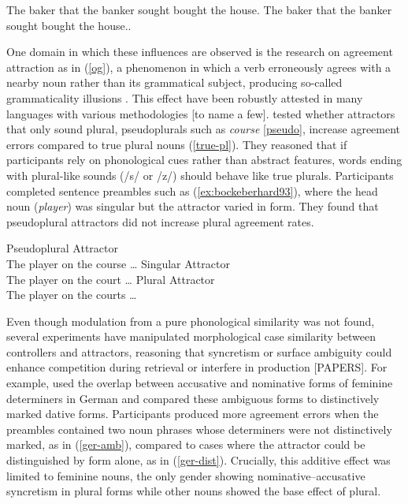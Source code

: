 \documentclass[
  authoryear,
  3p]{elsarticle}
\begin{document}
\begin{exe}
\ex \label{baker} The baker that the banker sought bought the house.
\ex \label{runner} The baker that the banker sought bought the house..
\end{exe}

One domain in which these influences are observed is the research on
agreement attraction as in (\ref{og}), a phenomenon in which a verb
erroneously agrees with a nearby noun rather than its grammatical
subject, producing so-called grammaticality illusions
\citep{BockMiller:1991, PearlmutterGarnseyBock:1999}. This effect have
been robustly attested in many languages with various methodologies
{[}to name a few{]}. \citet{BockEberhard1993} tested whether attractors
that only sound plural, pseudoplurals such as \emph{course}
\ref{pseudo}, increase agreement errors compared to true plural nouns
(\ref{true-pl}). They reasoned that if participants rely on phonological
cues rather than abstract features, words ending with plural-like sounds
(/s/ or /z/) should behave like true plurals. Participants completed
sentence preambles such as (\ref{ex:bockeberhard93}), where the head
noun (\emph{player}) was singular but the attractor varied in form. They
found that pseudoplural attractors did not increase plural agreement
rates.

\begin{exe}
\ex \label{ex:bockeberhard93}
\begin{xlist}
    \ex \label{pseudo} {Pseudoplural Attractor} \\ The {player} on the {course} \ldots{}
    \ex \label{true-sg} {Singular Attractor} \\ The {player} on the {court} \ldots{}
    \ex \label{true-pl} {Plural Attractor} \\ The {player} on the {courts} \ldots{}
\end{xlist}
\end{exe}

Even though modulation from a pure phonological similarity was not
found, several experiments have manipulated morphological case
similarity between controllers and attractors, reasoning that syncretism
or surface ambiguity could enhance competition during retrieval or
interfere in production {[}PAPERS{]}. For example,
\citet{HartsuikerEtAl2003} used the overlap between accusative and
nominative forms of feminine determiners in German and compared these
ambiguous forms to distinctively marked dative forms. Participants
produced more agreement errors when the preambles contained two noun
phrases whose determiners were not distinctively marked, as in
(\ref{ger-amb}), compared to cases where the attractor could be
distinguished by form alone, as in (\ref{ger-dist}). Crucially, this
additive effect was limited to feminine nouns, the only gender showing
nominative--accusative syncretism in plural forms while other nouns
showed the base effect of plural.
\end{document}
